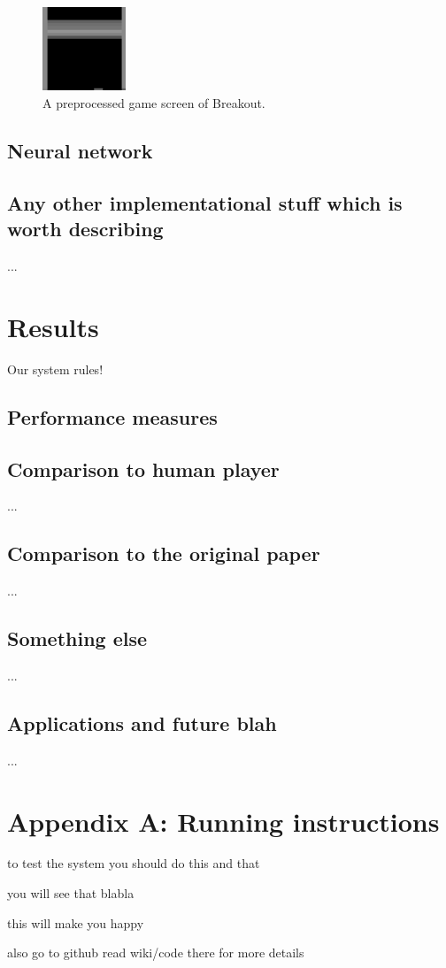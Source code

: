 \documentclass[a4paper,12pt]{article}
\begin{document}
\begin{figure}[h]
\centering
\includegraphics[width=2.5cm]{fig_preprocessedscreen}
\caption{A preprocessed game screen of Breakout.}
\label{fig:breakoutpreprocessed}
\end{figure}

\subsection{Neural network}


\subsection{Any other implementational stuff which is worth describing}
...


%
%
\pagebreak
\section{Results}
Our system rules!

\subsection{Performance measures}

\subsection{Comparison to human player}
...

\subsection{Comparison to the original paper}
...

\subsection{Something else}
...

\subsection{Applications and future blah}
...



%
%
\pagebreak
\section*{Appendix A: Running instructions}
to test the system you should do this and that

you will see that blabla

this will make you happy

also go to github read wiki/code there for more details



%
%
\pagebreak
{}


\end{document}

